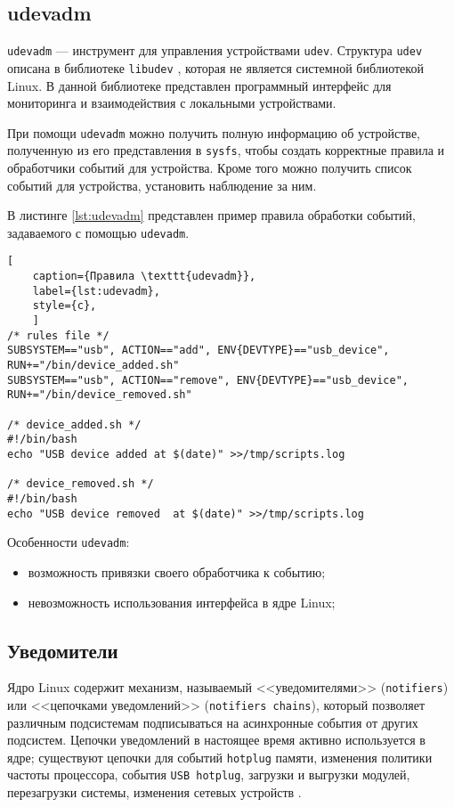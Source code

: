 \subsection{udevadm}

\texttt{udevadm} \cite{udevadm} --- инструмент для управления устройствами \texttt{udev}. Структура \texttt{udev} описана в библиотеке \texttt{libudev} \cite{libudev}, которая не является системной библиотекой Linux. В данной библиотеке представлен программный интерфейс для мониторинга и взаимодействия с локальными устройствами.

При помощи \texttt{udevadm} можно получить полную информацию об устройстве, полученную из его представления в \texttt{sysfs}, чтобы создать корректные правила и обработчики событий для устройства. Кроме того можно получить список событий для устройства, установить наблюдение за ним.

В листинге \ref{lst:udevadm} представлен пример правила обработки событий, задаваемого с помощью \texttt{udevadm}.

\begin{lstlisting}[
	caption={Правила \texttt{udevadm}},
	label={lst:udevadm},
	style={c},
	]
/* rules file */
SUBSYSTEM=="usb", ACTION=="add", ENV{DEVTYPE}=="usb_device",  RUN+="/bin/device_added.sh"
SUBSYSTEM=="usb", ACTION=="remove", ENV{DEVTYPE}=="usb_device", RUN+="/bin/device_removed.sh"

/* device_added.sh */
#!/bin/bash
echo "USB device added at $(date)" >>/tmp/scripts.log

/* device_removed.sh */
#!/bin/bash
echo "USB device removed  at $(date)" >>/tmp/scripts.log
\end{lstlisting}

Особенности \texttt{udevadm}:

\begin{itemize}
	\item возможность привязки своего обработчика к событию;
	\item невозможность использования интерфейса в ядре Linux;
\end{itemize}

\subsection{Уведомители}

Ядро Linux содержит механизм, называемый <<уведомителями>> (\texttt{notifiers}) или <<цепочками уведомлений>> (\texttt{notifiers chains}), который позволяет различным подсистемам подписываться на асинхронные события от других подсистем. Цепочки уведомлений в настоящее время активно используется в ядре; существуют цепочки для событий \texttt{hotplug} памяти, изменения политики частоты процессора, события \texttt{USB hotplug}, загрузки и выгрузки модулей, перезагрузки системы, изменения сетевых устройств \cite{notifications}.

